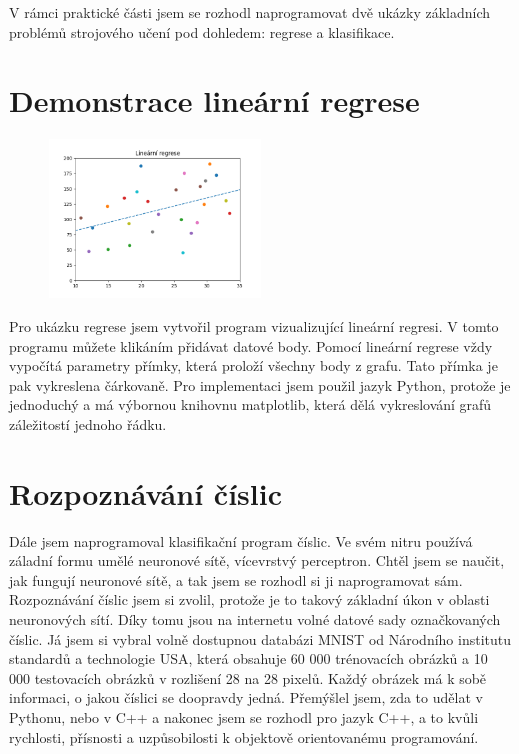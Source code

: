 \documentclass[a4paper,11pt, oneside]{book} \usepackage[czech]{babel}
\begin{document}
	V rámci praktické části jsem se rozhodl naprogramovat dvě ukázky základních
	problémů strojového učení pod dohledem: regrese a klasifikace.

	\section{Demonstrace lineární regrese}

	\begin{figure} %
		\centering
		\includegraphics[width=0.5\textwidth]{img/linear-regression-demo.png}
	\end{figure}

	Pro ukázku regrese jsem vytvořil program vizualizující lineární regresi.  V
	tomto programu můžete klikáním přidávat datové body. Pomocí lineární regrese
	vždy vypočítá parametry přímky, která proloží všechny body z grafu. Tato přímka
	je pak vykreslena čárkovaně.  Pro implementaci jsem použil jazyk Python,
	protože je jednoduchý a má výbornou knihovnu matplotlib, která dělá
	vykreslování grafů záležitostí jednoho řádku.


	\section{Rozpoznávání číslic}

	Dále jsem naprogramoval klasifikační program číslic. Ve svém nitru používá
	záladní formu umělé neuronové sítě, vícevrstvý perceptron.  Chtěl jsem se naučit, jak fungují
	neuronové sítě, a tak jsem se rozhodl si ji naprogramovat sám. Rozpoznávání
	číslic jsem si zvolil, protože je to takový základní úkon v oblasti neuronových
	sítí. Díky tomu jsou na internetu volné datové sady označkovaných číslic. Já
	jsem si vybral volně dostupnou databázi MNIST od Národního institutu standardů
	a technologie USA, která obsahuje 60 000 trénovacích obrázků a 10 000
	testovacích obrázků v rozlišení 28 na 28 pixelů. Každý obrázek má k sobě
	informaci, o jakou číslici se doopravdy jedná.  Přemýšlel jsem, zda to udělat v
	Pythonu, nebo v C++ a nakonec jsem se rozhodl pro jazyk C++, a to kvůli
	rychlosti, přísnosti a uzpůsobilosti k objektově orientovanému programování.
\end{document}

